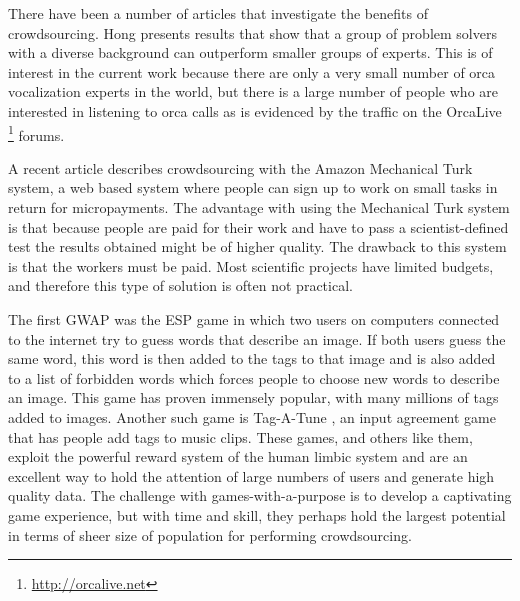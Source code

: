 \documentclass[12pt,oneside]{book}
\begin{document}
There have been a number of articles that investigate the benefits of
crowdsourcing.  Hong \cite{hong04crowdsourcing} presents results that
show that a group of problem solvers with a diverse background can
outperform smaller groups of experts.  This is of interest in the
current work because there are only a very small number of orca
vocalization experts in the world, but there is a large number of
people who are interested in listening to orca calls as is evidenced
by the traffic on the OrcaLive \footnote{\url{http://orcalive.net}}
forums.

A recent article \cite{kittur08crowdsourcing} describes crowdsourcing
with the Amazon Mechanical Turk system, a web based system where
people can sign up to work on small tasks in return for micropayments.
The advantage with using the Mechanical Turk system is that because
people are paid for their work and have to pass a scientist-defined
test the results obtained might be of higher quality.  The drawback to
this system is that the workers must be paid.  Most scientific
projects have limited budgets, and therefore this type of solution is
often not practical.

The first GWAP was the ESP game \cite{vonahn2004labelling} in which
two users on computers connected to the internet try to guess words
that describe an image.  If both users guess the same word, this word
is then added to the tags to that image and is also added to a list of
forbidden words which forces people to choose new words to describe an
image.  This game has proven immensely popular, with many millions of
tags added to images.  Another such game is Tag-A-Tune
\cite{law2009input}, an input agreement game that has people add tags
to music clips.  These games, and others like them, exploit the
powerful reward system of the human limbic system and are an excellent
way to hold the attention of large numbers of users and generate high
quality data.  The challenge with games-with-a-purpose is to develop a
captivating game experience, but with time and skill, they perhaps
hold the largest potential in terms of sheer size of population for
performing crowdsourcing.
\end{document}
